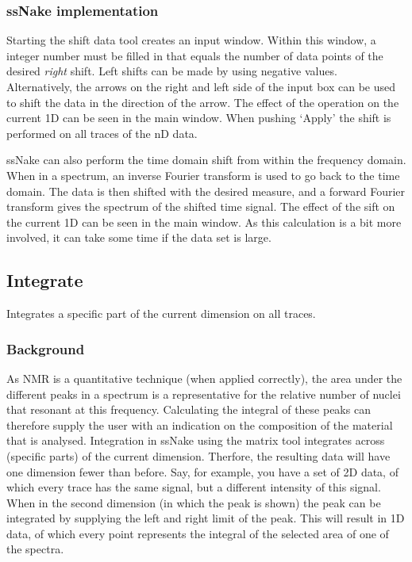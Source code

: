 \documentclass[11pt,a4paper]{article}
\begin{document}
\subsubsection*{ssNake implementation}
Starting the shift data tool creates an input window. Within this window, a integer number must be filled in that equals the number of data points of the  desired \textit{right} shift. Left shifts can be made by using negative values. Alternatively, the arrows on the right and left side of the input box can be used to shift the data in the direction of the arrow. The effect of the operation on the current 1D can be seen in the main window. When pushing `Apply' the shift is performed on all traces of the nD data.

ssNake can also perform the time domain shift from within the frequency domain. When in a spectrum, an inverse Fourier transform is used to go back to the time domain. The data is then shifted with the desired measure, and a forward Fourier transform gives the spectrum of the shifted time signal. The effect of the sift on the current 1D can be seen in the main window. As this calculation is a bit more involved, it can take some time if the data set is large.


\subsection{Integrate}
Integrates a specific part of the current dimension on all traces.

\subsubsection*{Background}
As NMR is a quantitative technique (when applied correctly), the area under the different peaks in a spectrum is a representative for the relative number of nuclei that resonant at this frequency. Calculating the integral of these peaks can therefore supply the user with an indication on the composition of the material that is analysed. Integration in ssNake using the matrix tool integrates across (specific parts) of the current dimension. Therfore, the resulting data will have one dimension fewer than before. Say, for example, you have a set of 2D data, of which every trace has the same signal, but a different intensity of this signal. When in the second dimension (in which the peak is shown) the peak can be integrated by supplying the left and right limit of the peak. This will result in 1D data, of which every point represents the integral of the selected area of one of the spectra.
\end{document}

